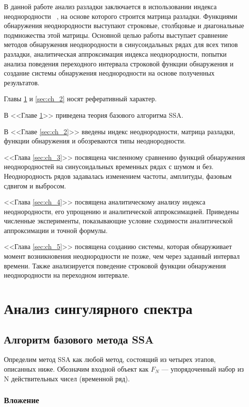 \documentclass[specialist, substylefile = spbu.rtx,
			   subf, href, 12pt]{disser}
\begin{document}
В данной работе анализ разладки заключается в использовании индекса неоднородности ~\cite{Golyandina2001}, на основе которого строится матрица разладки. Функциями обнаружения неоднородности выступают строковые, столбцовые и диагональные подмножества этой матрицы. Основной целью работы выступает сравнение методов обнаружения неоднородности в синусоидальных рядах для всех типов разладки, аналитическая аппроксимация индекса неоднородности, попытки анализа поведения переходного интервала строковой функции обнаружения и создание системы обнаружения неоднородности на основе полученных результатов.

Главы \ref{sec:ch_1} и \ref{sec:ch_2} носят реферативный характер.

В <<Главе \ref{sec:ch_1}>> приведена теория базового алгоритма SSA.

В <<Главе \ref{sec:ch_2}>> введены индекс неоднородности, матрица разладки, функции обнаружения и обозреваются типы неоднородности.

<<Глава \ref{sec:ch_3}>> посвящена численному сравнению функций обнаружения неоднородностей на синусоидальных временных рядах с шумом и без. Неоднородность рядов задавалась изменением частоты, амплитуды, фазовым сдвигом и выбросом.

<<Глава \ref{sec:ch_4}>> посвящена аналитическому анализу индекса неоднородности, его упрощению и аналитической аппроксимацией. Приведены численные эксперименты, показывающие условие сходимости аналитической аппроксимации и точной формулы.

<<Глава \ref{sec:ch_5}>> посвящена созданию системы, которая обнаруживает момент возникновения неоднородности не позже, чем через заданный интервал времени. Также анализируется поведение строковой функции обнаружения неоднородности на переходном интервале.



\newpage
\chapter{Анализ сингулярного спектра} \label{sec:ch_1}
\section{Алгоритм базового метода SSA}
Определим метод SSA как любой метод, состоящий из четырех этапов, описанных ниже. Обозначим входной объект как $F_N$ --- упорядоченный набор из $\mathrm{N}$ действительных чисел (временной ряд).

\subsection{Вложение}
\label{step:Embedding}
\end{document}
